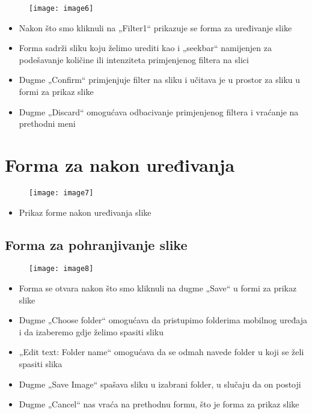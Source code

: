 \documentclass[12pt]{scrreprt}
\begin{document}
\begin{figure}[h]
	\begin{Center}
		\texttt{[image: image6]}
	\end{Center}
\end{figure}

\begin{itemize}
	\item	Nakon što smo kliknuli na „Filter1“ prikazuje se forma za uređivanje slike
	\item	Forma sadrži sliku koju želimo urediti kao i „seekbar“ namijenjen za podešavanje količine ili intenziteta primjenjenog filtera na slici
	\item	Dugme „Confirm“ primjenjuje filter na sliku i učitava je u prostor za sliku u formi za prikaz slike
	\item	Dugme „Discard“ omogućava odbacivanje primjenjenog filtera i vraćanje na prethodni meni
\end{itemize}

\chapter{Forma za nakon uređivanja}

\begin{figure}[h]
	\begin{Center}
		\texttt{[image: image7]}
	\end{Center}
\end{figure}

\begin{itemize}
	\item Prikaz forme nakon uređivanja slike
\end{itemize}

\break
\section{Forma za pohranjivanje slike}

\begin{figure}[h]
	\begin{Center}
		\texttt{[image: image8]}
	\end{Center}
\end{figure}

\begin{itemize}
	\item	Forma se otvara nakon što smo kliknuli na dugme „Save“ u formi za prikaz slike
	\item	Dugme „Choose folder“ omogućava da pristupimo folderima mobilnog uređaja i da izaberemo gdje želimo spasiti sliku
	\item  „Edit text: Folder name“ omogućava da se odmah navede folder u koji se želi spasiti slika
	\item  Dugme „Save Image“ spašava sliku u izabrani folder, u slučaju da on postoji
	\item  Dugme „Cancel“ nas vraća na prethodnu formu, što je forma za prikaz slike
\end{itemize}
\break
\end{document}
